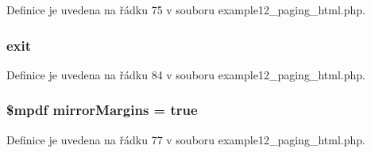 Definice je uvedena na řádku 75 v souboru example12\-\_\-paging\-\_\-html.\-php.

\hypertarget{example12__paging__html_8php_a6733eb5f605d09eaede9845835d71c4e}{
\subsubsection[{exit}]{\setlength{\rightskip}{0pt plus 5cm}exit}}\label{example12__paging__html_8php_a6733eb5f605d09eaede9845835d71c4e}


Definice je uvedena na řádku 84 v souboru example12\-\_\-paging\-\_\-html.\-php.

\hypertarget{example12__paging__html_8php_a24c284cb7774410f65953584ea1fd9c1}{
\subsubsection[{mirror\-Margins}]{\setlength{\rightskip}{0pt plus 5cm}\$mpdf mirror\-Margins = true}}\label{example12__paging__html_8php_a24c284cb7774410f65953584ea1fd9c1}


Definice je uvedena na řádku 77 v souboru example12\-\_\-paging\-\_\-html.\-php.

